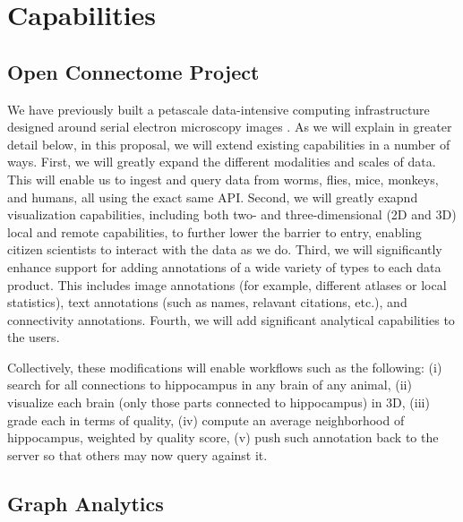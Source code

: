 \section{Capabilities} 





\subsection[ Open Connectome Project]{Open Connectome Project} \label{sss:ocp}

We have previously built a petascale data-intensive computing infrastructure designed around serial electron microscopy images \cite{Burns13a}. As we will explain in greater detail below, in this proposal, we will extend existing capabilities in a number of ways.  First, we will greatly expand the different modalities and scales of data.  This will enable us to ingest and query data from worms, flies, mice, monkeys, and humans, all using the exact same API.  Second, we will greatly exapnd visualization capabilities, including both two- and three-dimensional  (2D and 3D) local and remote capabilities, to further lower the barrier to entry, enabling citizen scientists to interact with the data as we do.  Third, we will significantly enhance support for adding annotations of a wide variety of types to each data product.  This includes image annotations (for example, different atlases or local statistics), text annotations (such as names, relavant citations, etc.), and connectivity annotations.  Fourth, we will add significant analytical capabilities to the users.  

Collectively, these modifications will enable workflows such as the following: (i) search for all connections to hippocampus in any brain of any animal, (ii) visualize each brain (only those parts connected to hippocampus) in 3D, (iii) grade each in terms of quality, (iv) compute an average neighborhood of hippocampus, weighted by quality score, (v) push such annotation back to the server so that others may now query against it. 


\subsection[ Graph Analytics]{Graph Analytics} \label{sss:graph}

